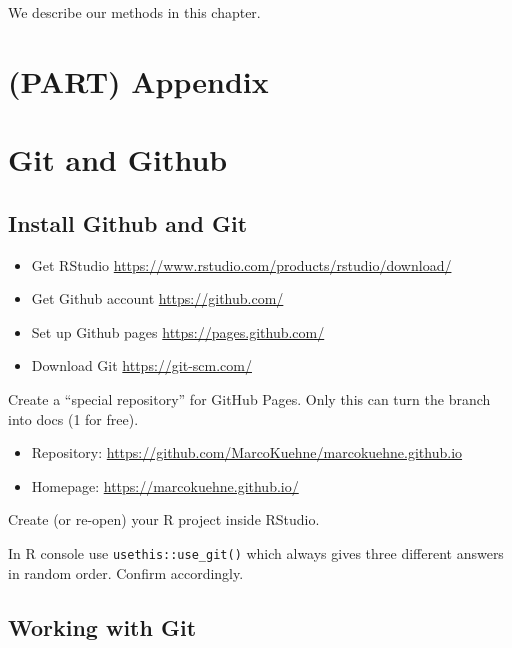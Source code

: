 \documentclass[
]{book}
\providecommand{\tightlist}{%
  \setlength{\itemsep}{0pt}\setlength{\parskip}{0pt}}
\begin{document}
We describe our methods in this chapter.

\hypertarget{part-appendix}{%
\chapter*{(PART) Appendix}\label{part-appendix}}

\hypertarget{git-and-github}{%
\chapter{Git and Github}\label{git-and-github}}

\hypertarget{install-github-and-git}{%
\section{Install Github and Git}\label{install-github-and-git}}

\begin{itemize}
\tightlist
\item
  Get RStudio \url{https://www.rstudio.com/products/rstudio/download/}
\item
  Get Github account \url{https://github.com/}
\item
  Set up Github pages \url{https://pages.github.com/}
\item
  Download Git \url{https://git-scm.com/}
\end{itemize}

Create a ``special repository'' for GitHub Pages. Only this can turn the branch into docs (1 for free).

\begin{itemize}
\tightlist
\item
  Repository: \url{https://github.com/MarcoKuehne/marcokuehne.github.io}
\item
  Homepage: \url{https://marcokuehne.github.io/}
\end{itemize}

Create (or re-open) your R project inside RStudio.

In R console use \texttt{usethis::use\_git()} which always gives three different answers in random order. Confirm accordingly.

\hypertarget{working-with-git}{%
\section{Working with Git}\label{working-with-git}}
\end{document}
